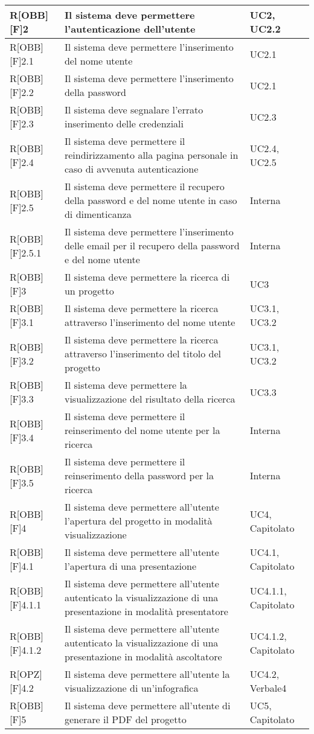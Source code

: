 \begin{table}[h]
		\begin{tabular}{|p{}|p{}|p{}|}
		\midrule

R[OBB][F]2 & Il sistema deve permettere l'autenticazione dell'utente & UC2, UC2.2 \\ \midrule
R[OBB][F]2.1 & Il sistema deve permettere l'inserimento del nome utente & UC2.1 \\ \midrule
R[OBB][F]2.2 & Il sistema deve permettere l'inserimento della password & UC2.1 \\ \midrule
R[OBB][F]2.3 & Il sistema deve segnalare l'errato inserimento delle credenziali & UC2.3 \\ \midrule
R[OBB][F]2.4 & Il sistema deve permettere il reindirizzamento alla pagina personale in caso di avvenuta autenticazione & UC2.4, UC2.5 \\ \midrule
R[OBB][F]2.5 & Il sistema deve permettere il recupero della password e del nome utente in caso di dimenticanza & Interna \\ \midrule
R[OBB][F]2.5.1 & Il sistema deve permettere l'inserimento delle email per il recupero della password e del nome utente & Interna \\ \midrule
R[OBB][F]3 & Il sistema deve permettere la ricerca di un progetto  & UC3 \\ \midrule
R[OBB][F]3.1 & Il sistema deve permettere la ricerca attraverso l'inserimento del nome utente & UC3.1, UC3.2 \\ \midrule
R[OBB][F]3.2 & Il sistema deve permettere la ricerca attraverso l'inserimento del titolo del progetto & UC3.1, UC3.2 \\ \midrule
R[OBB][F]3.3 & Il sistema deve permettere la visualizzazione del risultato della ricerca & UC3.3 \\ \midrule
R[OBB][F]3.4 & Il sistema deve permettere il reinserimento del nome utente per la ricerca & Interna \\ \midrule
R[OBB][F]3.5 & Il sistema deve permettere il reinserimento della password per la ricerca & Interna \\ \midrule
R[OBB][F]4 & Il sistema deve permettere all'utente l'apertura del progetto in modalità visualizzazione & UC4, Capitolato \\ \midrule
R[OBB][F]4.1 & Il sistema deve permettere all'utente l'apertura di una presentazione & UC4.1, Capitolato \\ \midrule
R[OBB][F]4.1.1 & Il sistema deve permettere all'utente autenticato la visualizzazione di una presentazione in modalità presentatore & UC4.1.1, Capitolato \\ \midrule
R[OBB][F]4.1.2 & Il sistema deve permettere all'utente autenticato la visualizzazione di una presentazione in modalità ascoltatore & UC4.1.2, Capitolato \\ \midrule
R[OPZ][F]4.2 & Il sistema deve permettere all'utente la visualizzazione di un'\gls{infografica} & UC4.2, Verbale4 \\ \midrule
R[OBB][F]5 & Il sistema deve permettere all'utente di generare il PDF del progetto & UC5, Capitolato \\ \midrule


\end{tabular}
\end{table}
